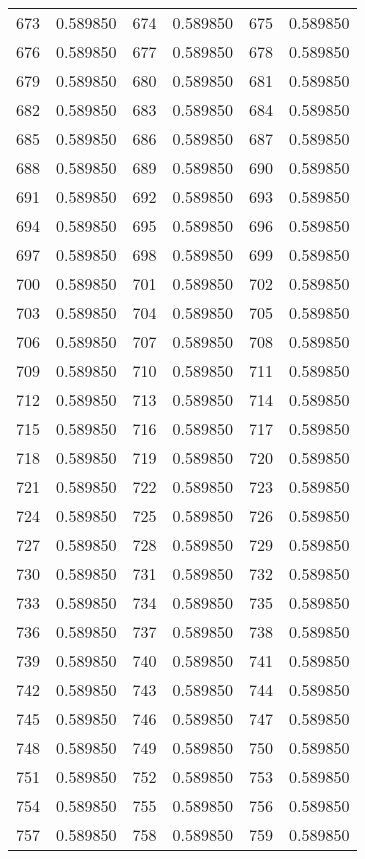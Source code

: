 \documentclass[12pt]{article}
\begin{document}
\begin{longtable}{@{}cc|cc|cc@{}}
673 & 0.589850 & 674 & 0.589850 & 675 & 0.589850 \\
676 & 0.589850 & 677 & 0.589850 & 678 & 0.589850 \\
679 & 0.589850 & 680 & 0.589850 & 681 & 0.589850 \\
682 & 0.589850 & 683 & 0.589850 & 684 & 0.589850 \\
685 & 0.589850 & 686 & 0.589850 & 687 & 0.589850 \\
688 & 0.589850 & 689 & 0.589850 & 690 & 0.589850 \\
691 & 0.589850 & 692 & 0.589850 & 693 & 0.589850 \\
694 & 0.589850 & 695 & 0.589850 & 696 & 0.589850 \\
697 & 0.589850 & 698 & 0.589850 & 699 & 0.589850 \\
700 & 0.589850 & 701 & 0.589850 & 702 & 0.589850 \\
703 & 0.589850 & 704 & 0.589850 & 705 & 0.589850 \\
706 & 0.589850 & 707 & 0.589850 & 708 & 0.589850 \\
709 & 0.589850 & 710 & 0.589850 & 711 & 0.589850 \\
712 & 0.589850 & 713 & 0.589850 & 714 & 0.589850 \\
715 & 0.589850 & 716 & 0.589850 & 717 & 0.589850 \\
718 & 0.589850 & 719 & 0.589850 & 720 & 0.589850 \\
721 & 0.589850 & 722 & 0.589850 & 723 & 0.589850 \\
724 & 0.589850 & 725 & 0.589850 & 726 & 0.589850 \\
727 & 0.589850 & 728 & 0.589850 & 729 & 0.589850 \\
730 & 0.589850 & 731 & 0.589850 & 732 & 0.589850 \\
733 & 0.589850 & 734 & 0.589850 & 735 & 0.589850 \\
736 & 0.589850 & 737 & 0.589850 & 738 & 0.589850 \\
739 & 0.589850 & 740 & 0.589850 & 741 & 0.589850 \\
742 & 0.589850 & 743 & 0.589850 & 744 & 0.589850 \\
745 & 0.589850 & 746 & 0.589850 & 747 & 0.589850 \\
748 & 0.589850 & 749 & 0.589850 & 750 & 0.589850 \\
751 & 0.589850 & 752 & 0.589850 & 753 & 0.589850 \\
754 & 0.589850 & 755 & 0.589850 & 756 & 0.589850 \\
757 & 0.589850 & 758 & 0.589850 & 759 & 0.589850 \\

\end{longtable}
\end{document}
